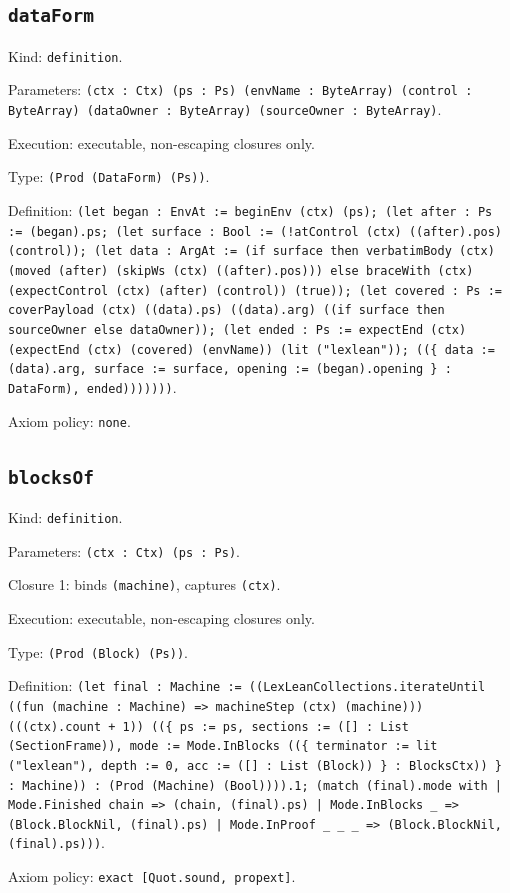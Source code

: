 \documentclass[11pt]{article}
\begin{document}
\subsection*{\texttt{dataForm}}
\noindent Kind: \texttt{definition}.\par
\noindent Parameters: \texttt{(ctx : Ctx) (ps : Ps) (envName : ByteArray) (control : ByteArray) (dataOwner : ByteArray) (sourceOwner : ByteArray)}.\par
\noindent Execution: executable, non-escaping closures only.\par
\noindent Type: \texttt{(Prod (DataForm) (Ps))}.\par
\noindent Definition: \texttt{(let began : EnvAt := beginEnv (ctx) (ps); (let after : Ps := (began).ps; (let surface : Bool := (!atControl (ctx) ((after).pos) (control)); (let data : ArgAt := (if surface then verbatimBody (ctx) (moved (after) (skipWs (ctx) ((after).pos))) else braceWith (ctx) (expectControl (ctx) (after) (control)) (true)); (let covered : Ps := coverPayload (ctx) ((data).ps) ((data).arg) ((if surface then sourceOwner else dataOwner)); (let ended : Ps := expectEnd (ctx) (expectEnd (ctx) (covered) (envName)) (lit ("lexlean")); ((\{ data := (data).arg, surface := surface, opening := (began).opening \} : DataForm), ended)))))))}.\par
\noindent Axiom policy: \texttt{none}.\par
\subsection*{\texttt{blocksOf}}
\noindent Kind: \texttt{definition}.\par
\noindent Parameters: \texttt{(ctx : Ctx) (ps : Ps)}.\par
\noindent Closure 1: binds \texttt{(machine)}, captures \texttt{(ctx)}.\par
\noindent Execution: executable, non-escaping closures only.\par
\noindent Type: \texttt{(Prod (Block) (Ps))}.\par
\noindent Definition: \texttt{(let final : Machine := ((LexLeanCollections.iterateUntil ((fun (machine : Machine) => machineStep (ctx) (machine))) (((ctx).count + 1)) ((\{ ps := ps, sections := ([] : List (SectionFrame)), mode := Mode.InBlocks ((\{ terminator := lit ("lexlean"), depth := 0, acc := ([] : List (Block)) \} : BlocksCtx)) \} : Machine)) : (Prod (Machine) (Bool)))).1; (match (final).mode with | Mode.Finished chain => (chain, (final).ps) | Mode.InBlocks \_ => (Block.BlockNil, (final).ps) | Mode.InProof \_ \_ \_ => (Block.BlockNil, (final).ps)))}.\par
\noindent Axiom policy: \texttt{exact [Quot.sound, propext]}.\par
\end{document}

